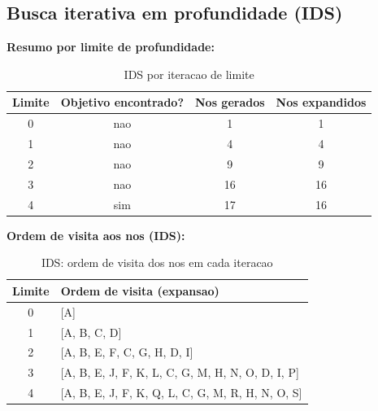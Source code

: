 \subsection{Busca iterativa em profundidade (IDS)}
\textbf{Resumo por limite de profundidade:}
\begin{table}[H]
\centering
\begin{tabular}{c c c c}
\toprule
Limite & Objetivo encontrado? & Nos gerados & Nos expandidos \\
\midrule
0 & nao & 1 & 1 \\
1 & nao & 4 & 4 \\
2 & nao & 9 & 9 \\
3 & nao & 16 & 16 \\
4 & sim & 17 & 16 \\
\bottomrule
\end{tabular}
\caption{IDS por iteracao de limite}
\end{table}

\textbf{Ordem de visita aos nos (IDS):}
\begin{table}[H]
\centering
\begin{tabular}{c p{10.5cm}}
\toprule
Limite & Ordem de visita (expansao) \\
\midrule
0 & [A] \\
1 & [A, B, C, D] \\
2 & [A, B, E, F, C, G, H, D, I] \\
3 & [A, B, E, J, F, K, L, C, G, M, H, N, O, D, I, P] \\
4 & [A, B, E, J, F, K, Q, L, C, G, M, R, H, N, O, S] \\
\bottomrule
\end{tabular}
\caption{IDS: ordem de visita dos nos em cada iteracao}
\end{table}

